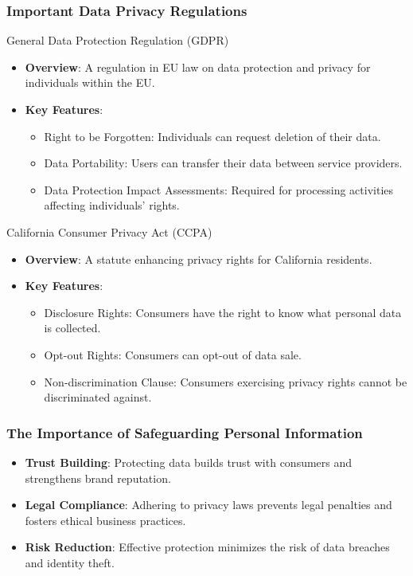 \documentclass[aspectratio=169]{beamer}
\begin{document}
\begin{frame}[fragile]
    \frametitle{Important Data Privacy Regulations}
    \begin{block}{General Data Protection Regulation (GDPR)}
        \begin{itemize}
            \item \textbf{Overview}: A regulation in EU law on data protection and privacy for individuals within the EU.
            \item \textbf{Key Features}:
            \begin{itemize}
                \item Right to be Forgotten: Individuals can request deletion of their data.
                \item Data Portability: Users can transfer their data between service providers.
                \item Data Protection Impact Assessments: Required for processing activities affecting individuals' rights.
            \end{itemize}
        \end{itemize}
    \end{block}
    
    \begin{block}{California Consumer Privacy Act (CCPA)}
        \begin{itemize}
            \item \textbf{Overview}: A statute enhancing privacy rights for California residents.
            \item \textbf{Key Features}:
            \begin{itemize}
                \item Disclosure Rights: Consumers have the right to know what personal data is collected.
                \item Opt-out Rights: Consumers can opt-out of data sale.
                \item Non-discrimination Clause: Consumers exercising privacy rights cannot be discriminated against.
            \end{itemize}
        \end{itemize}
    \end{block}
\end{frame}

\begin{frame}[fragile]
    \frametitle{The Importance of Safeguarding Personal Information}
    \begin{itemize}
        \item \textbf{Trust Building}: Protecting data builds trust with consumers and strengthens brand reputation.
        \item \textbf{Legal Compliance}: Adhering to privacy laws prevents legal penalties and fosters ethical business practices.
        \item \textbf{Risk Reduction}: Effective protection minimizes the risk of data breaches and identity theft.
    \end{itemize}
\end{frame}
\end{document}
